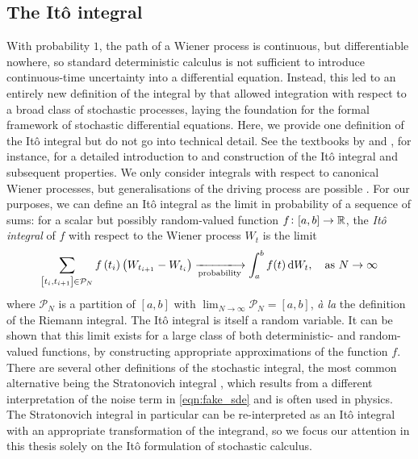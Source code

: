 \subsection{The It\^o integral}\label{sec:bkg_ito}
With probability \(1\), the path of a Wiener process is continuous, but differentiable nowhere, so standard deterministic calculus is not sufficient to introduce continuous-time uncertainty into a differential equation.
Instead, this led to an entirely new definition of the integral by \citet{Ito_1944_StochasticIntegral,Ito_1946_StochasticIntegralEquation} that allowed integration with respect to a broad class of stochastic processes, laying the foundation for the formal framework of stochastic differential equations.
Here, we provide one definition of the It\^o integral but do not go into technical detail.
See the textbooks by \citet{KallianpurSundar_2014_StochasticAnalysisDiffusion} and \citet{Oksendal_2003_StochasticDifferentialEquations}, for instance, for a detailed introduction to and construction of the It\^o integral and subsequent properties.
We only consider integrals with respect to canonical Wiener processes, but generalisations of the driving process are possible \citep{Applebaum_2004_LevyProcessesStochastic}.
For our purposes, we can define an It\^o integral as the limit in probability of a sequence of sums: for a scalar but possibly random-valued function \(f\colon [a,b] \to \mathbb{R}\), the \emph{It\^o integral} of \(f\) with respect to the Wiener process \(W_t\) is the limit
\begin{equation*}\label{eqn:ito_int_limit_defn}
	\sum_{\left[t_i, t_{i+1}\right] \in \mathcal{P}_N}{f\left(t_{i}\right)\left(W_{t_{i+1}} - W_{t_i}\right)} \xlongrightarrow[\text{probability}]{} \int_a^b{f(t)\dif W_t}, \quad \text{as } N \to \infty
\end{equation*}
where \(\mathcal{P}_N\) is a partition of \(\left[a,b\right]\) with \(\lim_{N \to \infty}\mathcal{P}_N = [a,b]\), \emph{\`a la} the definition of the Riemann integral.
The It\^o integral is itself a random variable.
It can be shown \citep[e.g.]{KallianpurSundar_2014_StochasticAnalysisDiffusion,Oksendal_2003_StochasticDifferentialEquations} that this limit exists for a large class of both deterministic- and random-valued functions, by constructing appropriate approximations of the function \(f\).
There are several other definitions of the stochastic integral, the most common alternative being the Stratonovich integral \citep{Stratonovich_1966_NewRepresentationStochastic}, which results from a different interpretation of the noise term in \cref{eqn:fake_sde} and is often used in physics.
The Stratonovich integral in particular can be re-interpreted as an It\^o integral with an appropriate transformation of the integrand, so we focus our attention in this thesis solely on the It\^o formulation of stochastic calculus.

